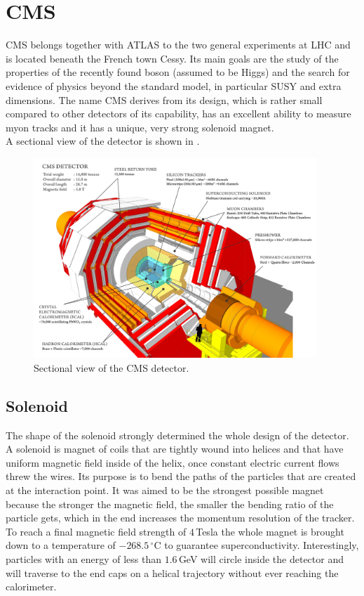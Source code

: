 \documentclass[british,11pt,a4paper]{memoir}
\begin{document}
\section{\ac{CMS}}
\ac{CMS} belongs together with \ac{ATLAS} to the two general experiments at \ac{LHC} and is located beneath the French town Cessy. Its main goals are the study of the properties of the recently found boson (assumed to be Higgs) and the search for evidence of physics beyond the standard model, in particular \ac{SUSY} and extra dimensions. The name \ac{CMS} derives from its design, which is rather small compared to other detectors of its capability, has an excellent ability to measure myon tracks and it has a unique, very strong solenoid magnet.\\
A sectional view of the detector is shown in .
\begin{figure}[ht]
	\centering
	\includegraphics[width=0.95\textwidth]{cms_cut}
	\caption{Sectional view of the CMS detector.}
	\label{p19}
\end{figure}
\subsection{Solenoid}
The shape of the solenoid strongly determined the whole design of the detector. A solenoid is magnet of coils that are tightly wound into helices and that have uniform magnetic field inside of the helix, once constant electric current flows threw the wires. Its purpose is to bend the paths of the particles that are created at the interaction point. It was aimed to be the strongest possible magnet because the stronger the magnetic field, the smaller the bending ratio of the particle gets, which in the end increases the momentum resolution of the tracker. To reach a final magnetic field strength of $4\,$Tesla the whole magnet is brought down to a temperature of $-268.5\,^{\circ}$C to guarantee superconductivity. Interestingly, particles with an energy of less than $1.6\,$GeV will circle inside the detector and will traverse to the end caps on a helical trajectory without ever reaching the calorimeter. 
\end{document}
